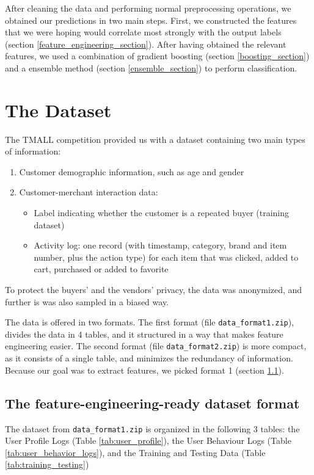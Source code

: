 \documentclass{article}
\begin{document}
After cleaning the data and performing normal preprocessing operations, we obtained our predictions in two main steps. First, we constructed the features that we were hoping would correlate most strongly with the output labels (section \ref{feature_engineering_section}). After having obtained the relevant features, we used a combination of gradient boosting (section \ref{boosting_section}) and a ensemble method (section \ref{ensemble_section}) to perform classification.

\section{The Dataset}\label{dataset_section}
The TMALL competition provided us with a dataset containing two main types of information:
\begin{enumerate}
    \item Customer demographic information, such as age and gender
    \item Customer-merchant interaction data:
    \begin{itemize}
        \item Label indicating whether the customer is a repeated buyer (training dataset) 
        \item Activity log: one record (with timestamp, category, brand and item number, plus the action type) for each item that was clicked, added to cart, purchased or added to favorite
    \end{itemize}
\end{enumerate}
To protect the buyers' and the vendors' privacy, the data was anonymized, and further is was also sampled in a biased way. 

The data is offered in two formats. The first format (file \texttt{data\_format1.zip}), divides the data in 4 tables, and it structured in a way that makes feature engineering easier. The second format (file \texttt{data\_format2.zip}) is more compact, as it consists of a single table, and minimizes the redundancy of information. Because our goal was to extract features, we picked format 1 (section \ref{dataset1_description}).

\subsection{The feature-engineering-ready dataset format}\label{dataset1_description}
The dataset from \texttt{data\_format1.zip} is organized in the following 3 tables: the User Profile Logs (Table \ref{tab:user_profile}), the User Behaviour Logs (Table \ref{tab:user_behavior_logs}), and the Training and Testing Data (Table \ref{tab:training_testing})
\end{document}

